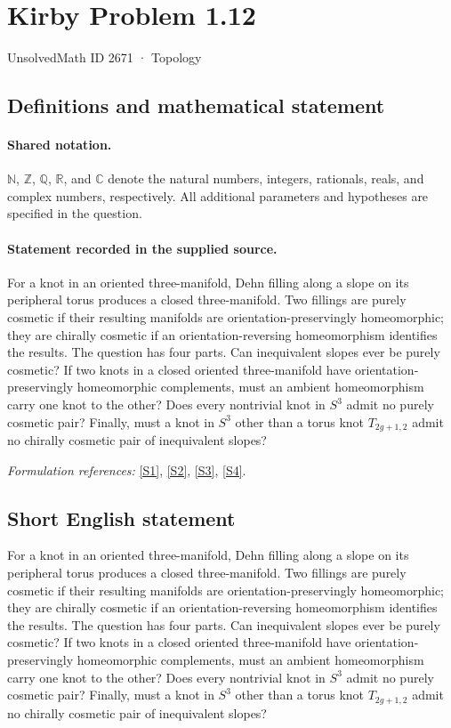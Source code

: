 \documentclass[11pt]{article}
\newcommand{\sref}[2]{\hyperlink{source:#1:#2}{[S#2]}}
\begin{document}
\setcounter{section}{2670}
\section{Kirby Problem 1.12}\label{2671}
{\small UnsolvedMath ID 2671 · Topology}
\subsection{Definitions and mathematical statement}

\paragraph{Shared notation.}$\mathbb N$, $\mathbb Z$, $\mathbb Q$, $\mathbb R$, and $\mathbb C$ denote the natural numbers, integers, rationals, reals, and complex numbers, respectively. All additional parameters and hypotheses are specified in the question.


\paragraph{Statement recorded in the supplied source.}
For a knot in an oriented three-manifold, Dehn filling along a slope on its peripheral torus produces a closed three-manifold. Two fillings are purely cosmetic if their resulting manifolds are orientation-preservingly homeomorphic; they are chirally cosmetic if an orientation-reversing homeomorphism identifies the results. The question has four parts. Can inequivalent slopes ever be purely cosmetic? If two knots in a closed oriented three-manifold have orientation-preservingly homeomorphic complements, must an ambient homeomorphism carry one knot to the other? Does every nontrivial knot in $S^3$ admit no purely cosmetic pair? Finally, must a knot in $S^3$ other than a torus knot $T_{2g+1,2}$ admit no chirally cosmetic pair of inequivalent slopes?
\par\smallskip\textit{Formulation references:} \sref{2671}{1}, \sref{2671}{2}, \sref{2671}{3}, \sref{2671}{4}.
\subsection{Short English statement}
For a knot in an oriented three-manifold, Dehn filling along a slope on its peripheral torus produces a closed three-manifold. Two fillings are purely cosmetic if their resulting manifolds are orientation-preservingly homeomorphic; they are chirally cosmetic if an orientation-reversing homeomorphism identifies the results. The question has four parts. Can inequivalent slopes ever be purely cosmetic? If two knots in a closed oriented three-manifold have orientation-preservingly homeomorphic complements, must an ambient homeomorphism carry one knot to the other? Does every nontrivial knot in $S^3$ admit no purely cosmetic pair? Finally, must a knot in $S^3$ other than a torus knot $T_{2g+1,2}$ admit no chirally cosmetic pair of inequivalent slopes?
\end{document}
